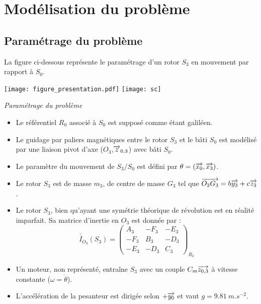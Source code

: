 \section{Modélisation du problème}
\subsection{Paramétrage du problème}

\begin{multicols}{2}
La figure ci-dessous représente le paramétrage d'un rotor $S_3$ en mouvement par rapport à $S_0$.

\begin{center}
\texttt{[image: figure\_presentation.pdf]}
\texttt{[image: sc]}
\end{center}
\textit{Paramétrage du problème}



\begin{itemize}
\item Le référentiel $R_0$ associé à $S_0$ est supposé comme étant galiléen.
\item Le guidage par paliers magnétiques entre le rotor $S_3$ et le bâti $S_0$ est modélisé par une liaison pivot d'axe ($O_3$,$\overrightarrow{z}_{0,3}$) avec bâti $S_0$.
\item Le paramètre du mouvement de $S_3/S_0$ est défini par $\theta=(\overrightarrow{x_0},\overrightarrow{x_3})$.
\item Le rotor $S_3$ est de masse $m_3$, de centre de masse $G_3$ tel que $\overrightarrow{O_3G_3}=b \overrightarrow{y_3}+c\overrightarrow{z_3}$.
\item Le rotor $S_3$, bien qu'ayant une symétrie théorique de révolution est en réalité imparfait. Sa matrice d'inertie en $O_3$ est donnée par :
$$
\overline{\overline{I}}_{O_3}(S_3)=\left(\begin{array}{ccc}
A_3 & -F_3 & -E_3 \\ 
-F_3 & B_3 & -D_3 \\ 
-E_3 & -D_3 & C_3
\end{array} \right)_{R_3}
$$
\item Un moteur, non représenté, entraîne $S_3$ avec un couple $C_m \overrightarrow{z_{0,3}}$ à vitesse constante ($\omega=\dot{\theta}$).
\item L'accélération de la pesanteur est dirigée selon $+\overrightarrow{y_0}$ et vaut $g=\SI{9,81}{m.s^{-2}}$.
\end{itemize}
\end{multicols}

